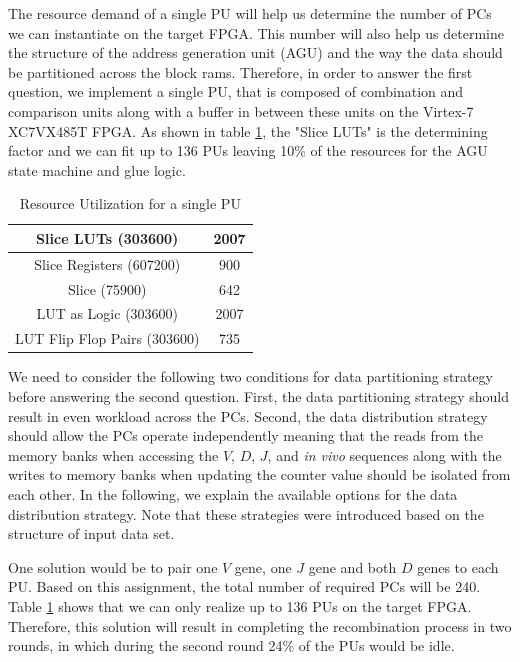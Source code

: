 The resource demand of a single PU will help us determine the number of PCs we can instantiate on the target FPGA. This number will also help us determine the structure of the address generation unit (AGU) and the way the data should be partitioned across the block rams. Therefore, in order to answer the first question, we implement a single PU, that is composed of combination and comparison units along with a buffer in between these units on the Virtex-7 XC7VX485T FPGA. As shown in table \ref{tab:5}, the "Slice LUTs" is the determining factor and we can fit up to 136 PUs leaving 10\% of the resources for the AGU state machine and glue logic. 


\begin{table}[t!]
\caption{Resource Utilization for a single PU}
\begin{center}
\begin{tabular}{ |c|c| }
  \hline
    Slice LUTs (303600) & 2007 \\	\hline
    Slice Registers (607200) & 900\\	\hline
    Slice (75900) & 642\\	\hline
    LUT as Logic (303600)& 2007\\	\hline
    LUT Flip Flop Pairs (303600) & 735\\
  \hline
\end{tabular}

  \label{tab:5}
\end{center}
\end{table}  

We need to consider the following two conditions for data partitioning strategy before answering the second question. First, the data partitioning strategy should result in even workload across the PCs. Second, the data distribution strategy should allow the PCs operate independently meaning that the reads from the memory banks when accessing the $V$, $D$, $J$, and \emph{in vivo} sequences along with the writes to memory banks when updating the counter value should be isolated from each other. In the following, we explain the available options for the data distribution strategy. Note that these strategies were introduced based on the structure of input data set.

One solution would be to pair one $V$ gene, one $J$ gene and both $D$ genes to each PU. Based on this assignment, the total number of required PCs will be 240. Table \ref{tab:5} shows that we can only realize up to 136 PUs on the target FPGA. Therefore, this solution will result in completing the recombination process in two rounds, in which during the second round 24\% of the PUs would be idle. 


